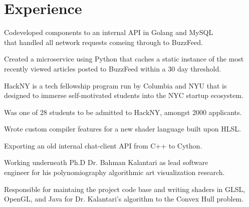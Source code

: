 \documentclass[]{deedy-resume-openfont}
\begin{document}
\begin{minipage}[t]{0.66\textwidth} 


\section{Experience}

\vspace{\topsep}
\begin{tightemize}
\item Codeveloped components to an internal API in Golang and MySQL \\that handled all network requests comeing through to BuzzFeed. 
\item Created a microservice using Python that caches a static instance of the most recently viewed articles posted to BuzzFeed within a 30 day threshold.
\end{tightemize}
\sectionsep

\begin{tightemize}
\item HackNY is a tech fellowship program run by Columbia and NYU that is \\designed to immerse self-motivated students into the NYC startup ecosystem.
\item Was one of 28 students to be admitted to HackNY, amongst 2000 applicants.
\end{tightemize}
\sectionsep

\begin{tightemize}
\item Wrote custom compiler features for a new shader language built upon HLSL.
\item Exporting an old internal chat-client API from C++ to Cython.
\end{tightemize}
\sectionsep

\begin{tightemize}
\item Working underneath Ph.D Dr. Bahman Kalantari as lead software \\engineer for his polynomiography algorithmic art visualization research.
\item Responsible for maintaing the project code base and writing shaders in GLSL, OpenGL, and Java for Dr. Kalantari's algorithm to the Convex Hull problem.
\end{tightemize}
\sectionsep


\end{minipage}
\end{document}
